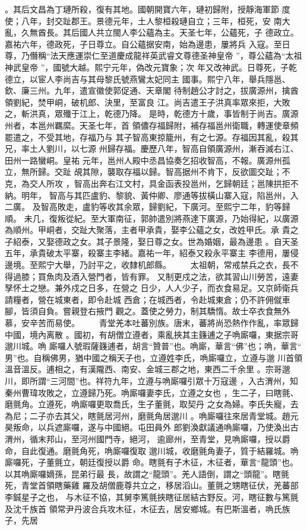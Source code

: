 \documentclass{ctexart}
\begin{document}
。其后文昌為丁璉所殺，復有其地。國朝開寶六年，璉初歸附，授靜海軍節 度使；八年，封交趾郡王。景德元年，土人黎桓殺璉自立；三年，桓死，安 南大亂，久無酋長。其后國人共立閩人李公蘊為主。天圣七年，公蘊死，子 德政立。嘉祐六年，德政死，子日尊立。自公蘊据安南，始為邊患，屢將兵 入寇。至日尊，乃僭稱``法天應運崇仁至道慶成龍祥英武睿文尊德圣神皇帝 ''，尊公蘊為``太祖神武皇帝 ''，國號大越。熙宁元年，偽改元寶象；次 年又改神武。日尊死，子乾德立，以宦人李尚吉与其母黎氏號燕鸞太妃同主 國事。熙宁八年，舉兵隱邕、欽、廉三州。九年，遣宣徽使郭促通、天章閣 待制趙公才討之，拔廣源州，擒酋領劉紀，焚甲峒，破机郎、決里，至富良 江。尚吉遣王子洪真率眾來拒，大敗之，斬洪真，眾殲于江上，乾德乃降。 是時，乾德方十歲，事皆制于尚吉。廣源州者，本邕州羈縻。天圣七年，首 領儂存福歸附，補存福邕州衛職，轉運使章頻罷遣之，不受其地，存福乃与 其子智高東掠籠州，有之七源。存福因其亂，殺其兄，率土人劉川，以七源 州歸存福。慶歷八年，智高自領廣源州，漸吞滅右江、田州一路蠻峒。皇祐 元年，邕州人殿中丞昌協奏乞招收智高，不報。廣源州孤立，無所歸。交趾 覘其隙，襲取存福以歸。智高据州不肯下，反欲圖交趾；不克，為交人所攻 ，智高出奔右江文村，具金函表投邕州，乞歸朝廷；邕陳拱拒不納。明年， 智高与其匹盧豹、黎貌、黃仲卿、廖通等拔橫山寨入寇，陷邕州，入二廣。 及智高敗走，盧豹等收其余眾，歸劉紀，下廣河。至熙宁二年，豹等歸順。 未几，復叛從紀。至大軍南征，郭帥遣別將燕達下廣源，乃始得紀，以廣源 為順州。甲峒者，交趾大聚落，主者甲承貴，娶李公蘊之女，改姓甲氏。承 貴之子紹泰，又娶德政之女。其子景隆，娶日尊之女。世為婚姻，最為邊患 。自天圣五年，承貴破太平寨，殺寨主李緒。嘉祐一年，紹泰又殺永平寨主 李德用，屢侵邊境。至熙宁大舉，乃討平之，收隸机郎縣。 　　太祖朝，常戒禁兵之衣，長不得過膝；買魚肉及酒入營門者，皆有罪。 又制更戍之法，欲其習山川勞苦，遠妻孥怀土之戀。兼外戍之日多，在營之 日少，人人少子，而衣食易足。又京師衛兵請糧者，營在城東者，即令赴城 西倉；在城西者，令赴城東倉；仍不許佣僦車腳，皆須自負。嘗親登右掖門 觀之。蓋使之勞力，制其驕惰。故士卒衣食無外慕，安辛苦而易使。 　　青堂羌本吐蕃別族。唐末，蕃將尚恐熱作作亂，率眾歸中國，境內离散 。國初，有胡僧立遵者，乘亂挾其主籛逋之子唃廝囉，東据宗哥邈川城。唃 廝囉人號瑕薩籛逋者，胡言``贊普''也。唃廝，華言``佛''也；唃，華言`` 男''也。自稱佛男，猶中國之稱天子也，立遵姓李氏，唃廝囉立，立遵与邈 川首領溫音溫反。逋相之，有漢隴西、南安、金城三郡之地，東西二千余里 。宗哥邈川，即所謂``三河間''也。祥符九年，立遵与唃廝囉引眾十万寇邊 ，入古渭州，知秦州曹瑋攻敗之，立遵歸乃死。唃廝囉妻李氏，立遵之女也 ，生二子，曰瞎氈、磨氈角。立遵死，唃廝囉更取喬氏，生子董氈，取契丹 之女為婦。李氏失寵，去為尼；二子亦去其父，瞎氈居河州，磨氈角居邈川 。唃廝囉往來居青堂城。趙元昊叛命，以兵遮廝囉，遂与中國絕。屯田員外 郎劉渙獻議通唃廝囉，乃使渙出古渭州，循末邦山，至河州國門寺，絕河， 逾廊州，至青堂，見唃廝囉，授以爵命，自此復通。磨氈角死，唃廝囉復取 邈川城，收磨氈角妻子，質于結羅城。唃廝囉死，子董氈立，朝廷復授以爵 命。瞎氈有子木征，木征者，華言``龍頭''也。以其唃廝囉嫡孫，昆弟行最 長，故謂之``龍頭''。羌人語倒，謂之``頭龍''。瞎氈死，青堂首領瞎藥雞 羅及胡僧鹿尊共立之，移居滔山。董氈之甥瞎征伏，羌蕃部李鋮星子之也， 与木征不協，其舅李篤氈挾瞎征居結古野反。河，瞎征數与篤氈及沈千族首 領常尹丹波合兵攻木征，木征去，居安鄉城。有巴斯溫者，唃氏族子，先居 
\end{document}
